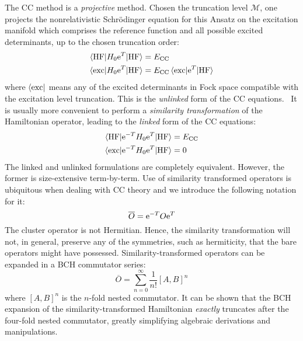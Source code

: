 The \acrshort{CC} method is a \emph{projective} method. Chosen the truncation
level $\mathcal{M}$, one projects the nonrelativistic Schrödinger
equation for this Ansatz on the excitation manifold which comprises the
reference function and all possible excited determinants, up to the
chosen truncation order:
\begin{subequations}
  \begin{align}
    \braket{\mathrm{HF} | H_0\mathrm{e}^{T} | \mathrm{HF}} &= E_\mathrm{CC} \\
    \braket{\mathrm{exc} | H_0\mathrm{e}^{T} | \mathrm{HF}} &=
    E_\mathrm{CC}\braket{\mathrm{exc} | \mathrm{e}^{T} | \mathrm{HF}}
  \end{align}
\end{subequations}
where $\bra{\mathrm{exc}}$ means any of the excited determinants in Fock
space compatible with the excitation level truncation.
This is the \emph{unlinked} form of the \acrshort{CC}
equations.~\autocite{Helgaker2000-tz} It is usually more convenient to
perform a \emph{similarity transformation} of the Hamiltonian operator,
leading to the \emph{linked} form of the \acrshort{CC} equations:
\begin{subequations}
  \begin{align}
    \braket{\mathrm{HF} | \mathrm{e}^{-T}H_0\mathrm{e}^{T} | \mathrm{HF}} &= E_\mathrm{CC} \\
    \braket{\mathrm{exc} | \mathrm{e}^{-T}H_0\mathrm{e}^{T} | \mathrm{HF}} &= 0
  \end{align}
\end{subequations}
The linked and unlinked formulations are completely equivalent. However,
the former is size-extensive term-by-term.
Use of similarity transformed operators is ubiquitous when dealing with
\acrshort{CC} theory and we introduce the following notation for it:
\begin{equation}
  \overline{O} =\mathrm{e}^{-T}O\mathrm{e}^{T}
\end{equation}
The cluster operator is not Hermitian. Hence, the similarity transformation
will not, in general, preserve any of the symmetries, such as
hermiticity, that the bare operators might have possessed.
Similarity-transformed operators can be expanded in a \acrshort{BCH} commutator series:
\begin{equation}
  \overline{O} =
  \sum_{n=0}^{\infty}\frac{1}{n!}[A, B]^n
\end{equation}
where $[A,B]^n$ is the $n$-fold nested commutator. It can be shown that
the \acrshort{BCH} expansion of the similarity-transformed Hamiltonian
\emph{exactly} truncates after the four-fold nested commutator, greatly
simplifying algebraic derivations and manipulations.


